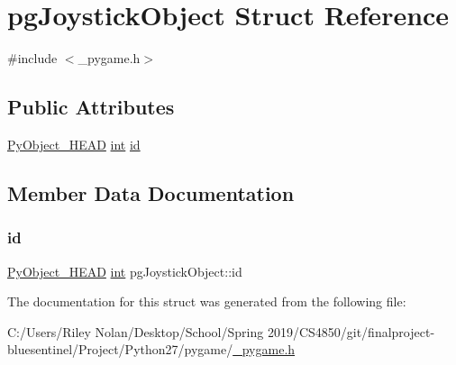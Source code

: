 \hypertarget{structpg_joystick_object}{}\section{pg\+Joystick\+Object Struct Reference}
\label{structpg_joystick_object}


{\ttfamily \#include $<$\+\_\+pygame.\+h$>$}

\subsection*{Public Attributes}
\begin{DoxyCompactItemize}
\item 
\mbox{\hyperlink{_python27_2object_8h_a0bf35c1f3ea13f925de94d8593db3b7e}{Py\+Object\+\_\+\+H\+E\+AD}} \mbox{\hyperlink{warnings_8h_a74f207b5aa4ba51c3a2ad59b219a423b}{int}} \mbox{\hyperlink{structpg_joystick_object_a1a429139a60a22df2c6c353ef3a50e49}{id}}
\end{DoxyCompactItemize}


\subsection{Member Data Documentation}
\mbox{\label{structpg_joystick_object_a1a429139a60a22df2c6c353ef3a50e49}} 
\subsubsection{\texorpdfstring{id}{id}}
{\footnotesize\ttfamily \mbox{\hyperlink{_python27_2object_8h_a0bf35c1f3ea13f925de94d8593db3b7e}{Py\+Object\+\_\+\+H\+E\+AD}} \mbox{\hyperlink{warnings_8h_a74f207b5aa4ba51c3a2ad59b219a423b}{int}} pg\+Joystick\+Object\+::id}



The documentation for this struct was generated from the following file\+:\begin{DoxyCompactItemize}
\item 
C\+:/\+Users/\+Riley Nolan/\+Desktop/\+School/\+Spring 2019/\+C\+S4850/git/finalproject-\/bluesentinel/\+Project/\+Python27/pygame/\mbox{\hyperlink{__pygame_8h}{\+\_\+pygame.\+h}}\end{DoxyCompactItemize}
